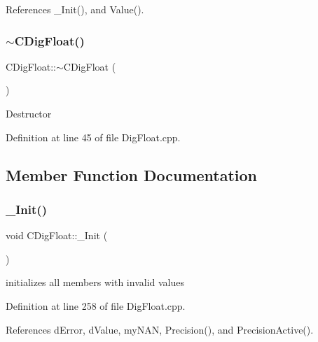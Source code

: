 References \+\_\+\+Init(), and Value().

\mbox{\label{classCDigFloat_adfee37b740660ebebcca8a088554e342}} 
\subsubsection{\texorpdfstring{$\sim$\+C\+Dig\+Float()}{~CDigFloat()}}
{\footnotesize\ttfamily C\+Dig\+Float\+::$\sim$\+C\+Dig\+Float (\begin{DoxyParamCaption}{ }\end{DoxyParamCaption})}

Destructor 

Definition at line 45 of file Dig\+Float.\+cpp.



\subsection{Member Function Documentation}
\mbox{\label{classCDigFloat_a89a0dda21c74c115ac41b432031666a6}} 
\subsubsection{\texorpdfstring{\+\_\+\+Init()}{\_Init()}}
{\footnotesize\ttfamily void C\+Dig\+Float\+::\+\_\+\+Init (\begin{DoxyParamCaption}{ }\end{DoxyParamCaption})\hspace{0.3cm}{\ttfamily [protected]}}



initializes all members with invalid values 



Definition at line 258 of file Dig\+Float.\+cpp.



References d\+Error, d\+Value, my\+N\+AN, Precision(), and Precision\+Active().

\mbox{\label{classCDigFloat_a006a43f81560e2429dce9aca7742a4e7}} 
